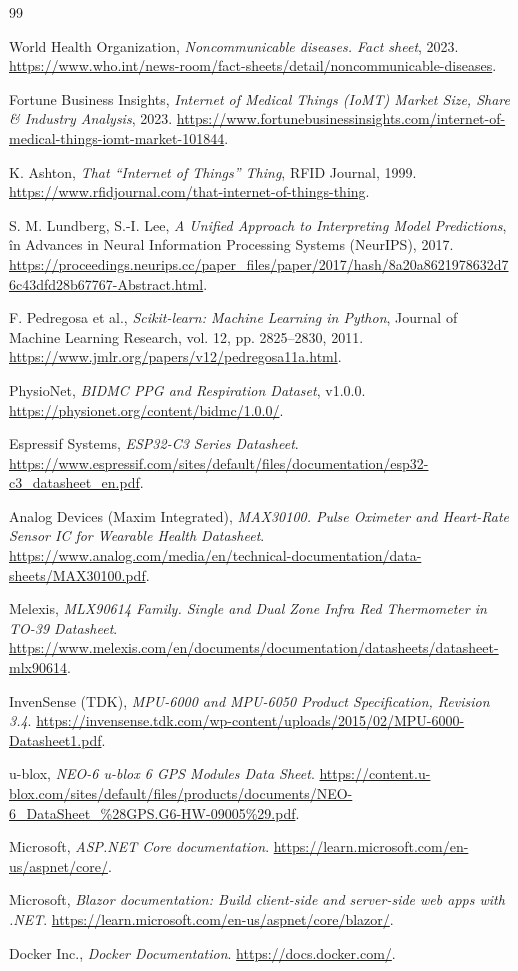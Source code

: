 ﻿\documentclass[12pt,a4paper,twoside]{article}
\begin{document}
\newpage
{}
{}
\begin{thebibliography}{99}

 World Health Organization, \textit{Noncommunicable diseases. Fact sheet}, 2023. \url{https://www.who.int/news-room/fact-sheets/detail/noncommunicable-diseases}.

 Fortune Business Insights, \textit{Internet of Medical Things (IoMT) Market Size, Share \& Industry Analysis}, 2023. \url{https://www.fortunebusinessinsights.com/internet-of-medical-things-iomt-market-101844}.

 K. Ashton, \textit{That ``Internet of Things'' Thing}, RFID Journal, 1999. \url{https://www.rfidjournal.com/that-internet-of-things-thing}.

 S. M. Lundberg, S.-I. Lee, \textit{A Unified Approach to Interpreting Model Predictions}, în Advances in Neural Information Processing Systems (NeurIPS), 2017. \url{https://proceedings.neurips.cc/paper_files/paper/2017/hash/8a20a8621978632d76c43dfd28b67767-Abstract.html}.

 F. Pedregosa et al., \textit{Scikit-learn: Machine Learning in Python}, Journal of Machine Learning Research, vol. 12, pp. 2825--2830, 2011. \url{https://www.jmlr.org/papers/v12/pedregosa11a.html}.

 PhysioNet, \textit{BIDMC PPG and Respiration Dataset}, v1.0.0. \url{https://physionet.org/content/bidmc/1.0.0/}.

 Espressif Systems, \textit{ESP32-C3 Series Datasheet}. \url{https://www.espressif.com/sites/default/files/documentation/esp32-c3_datasheet_en.pdf}.

 Analog Devices (Maxim Integrated), \textit{MAX30100. Pulse Oximeter and Heart-Rate Sensor IC for Wearable Health Datasheet}. \url{https://www.analog.com/media/en/technical-documentation/data-sheets/MAX30100.pdf}.

 Melexis, \textit{MLX90614 Family. Single and Dual Zone Infra Red Thermometer in TO-39 Datasheet}. \url{https://www.melexis.com/en/documents/documentation/datasheets/datasheet-mlx90614}.

 InvenSense (TDK), \textit{MPU-6000 and MPU-6050 Product Specification, Revision 3.4}. \url{https://invensense.tdk.com/wp-content/uploads/2015/02/MPU-6000-Datasheet1.pdf}.

 u-blox, \textit{NEO-6 u-blox 6 GPS Modules Data Sheet}. \url{https://content.u-blox.com/sites/default/files/products/documents/NEO-6_DataSheet_\%28GPS.G6-HW-09005\%29.pdf}.

 Microsoft, \textit{ASP.NET Core documentation}. \url{https://learn.microsoft.com/en-us/aspnet/core/}.

 Microsoft, \textit{Blazor documentation: Build client-side and server-side web apps with .NET}. \url{https://learn.microsoft.com/en-us/aspnet/core/blazor/}.

 Docker Inc., \textit{Docker Documentation}. \url{https://docs.docker.com/}.

\end{thebibliography}
\end{document}
